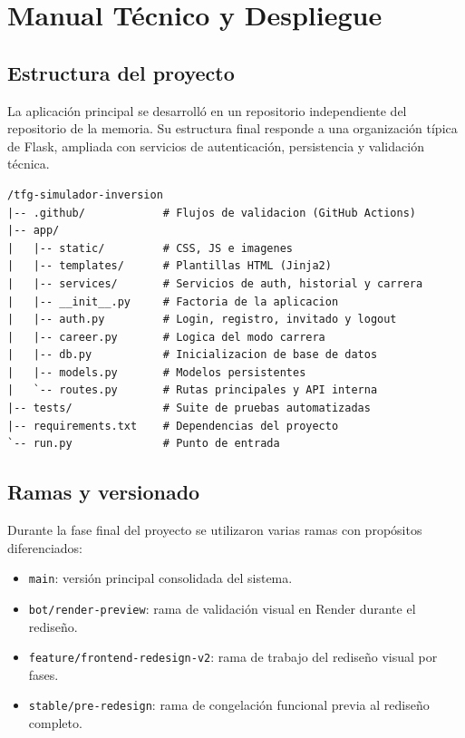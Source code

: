 \chapter{Manual Técnico y Despliegue}
\label{appendix:manual}

\section{Estructura del proyecto}

La aplicación principal se desarrolló en un repositorio independiente del repositorio de la memoria. Su estructura final responde a una organización típica de Flask, ampliada con servicios de autenticación, persistencia y validación técnica.

\begin{verbatim}
/tfg-simulador-inversion
|-- .github/            # Flujos de validacion (GitHub Actions)
|-- app/
|   |-- static/         # CSS, JS e imagenes
|   |-- templates/      # Plantillas HTML (Jinja2)
|   |-- services/       # Servicios de auth, historial y carrera
|   |-- __init__.py     # Factoria de la aplicacion
|   |-- auth.py         # Login, registro, invitado y logout
|   |-- career.py       # Logica del modo carrera
|   |-- db.py           # Inicializacion de base de datos
|   |-- models.py       # Modelos persistentes
|   `-- routes.py       # Rutas principales y API interna
|-- tests/              # Suite de pruebas automatizadas
|-- requirements.txt    # Dependencias del proyecto
`-- run.py              # Punto de entrada
\end{verbatim}

\section{Ramas y versionado}

Durante la fase final del proyecto se utilizaron varias ramas con propósitos diferenciados:

{\sloppy
\begin{itemize}
    \item \texttt{main}: versión principal consolidada del sistema.
    \item \texttt{bot/render-preview}: rama de validación visual en Render durante el rediseño.
    \item \texttt{feature/frontend-redesign-v2}: rama de trabajo del rediseño visual por fases.
    \item \texttt{stable/pre-redesign}: rama de congelación funcional previa al rediseño completo.
\end{itemize}
\par}

